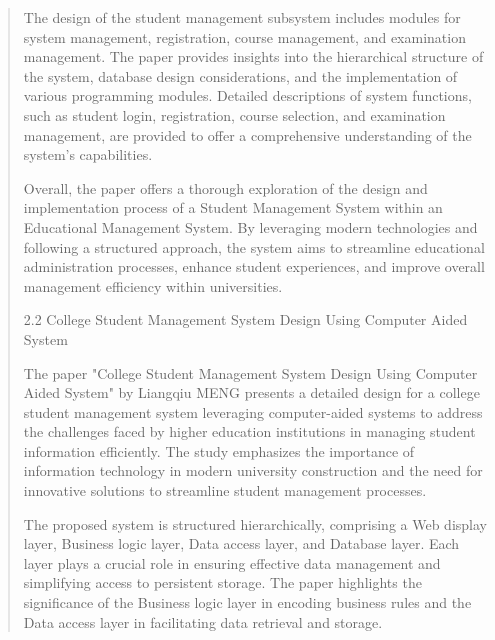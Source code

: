 \documentclass[12pt]{report}
\begin{document}
\begin{quote}
	
	The design of the student management subsystem includes modules for system management, registration, course management, and examination management. The paper provides insights into the hierarchical structure of the system, database design considerations, and the implementation of various programming modules. Detailed descriptions of system functions, such as student login, registration, course selection, and examination management, are provided to offer a comprehensive understanding of the system's capabilities.
	
	Overall, the paper offers a thorough exploration of the design and implementation process of a Student Management System within an Educational Management System. By leveraging modern technologies and following a structured approach, the system aims to streamline educational administration processes, enhance student experiences, and improve overall management efficiency within universities.
	\clearpage
	
	2.2 College Student Management System Design Using Computer Aided System
	
	The paper "College Student Management System Design Using Computer Aided System" by Liangqiu MENG presents a detailed design for a college student management system leveraging computer-aided systems to address the challenges faced by higher education institutions in managing student information efficiently. The study emphasizes the importance of information technology in modern university construction and the need for innovative solutions to streamline student management processes.
	
	The proposed system is structured hierarchically, comprising a Web display layer, Business logic layer, Data access layer, and Database layer. Each layer plays a crucial role in ensuring effective data management and simplifying access to persistent storage. The paper highlights the significance of the Business logic layer in encoding business rules and the Data access layer in facilitating data retrieval and storage.
	

\end{quote}
\end{document}
